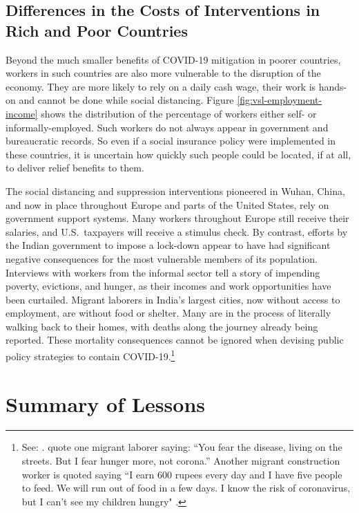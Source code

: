 \documentclass[11pt]{article}
\begin{document}
\begin{mdframed}
\subsection{Differences in the Costs of Interventions in Rich and Poor Countries}

Beyond the much smaller benefits of COVID-19 mitigation in poorer countries, workers in such countries are also more vulnerable to the disruption of the economy. They are more likely to rely on a daily cash wage, their work is hands-on and cannot be done while social distancing. Figure \ref{fig:vsl-employment-income} shows the distribution of the percentage of workers either self- or informally-employed. Such workers do not always appear in government and bureaucratic records. So even if a social insurance policy were implemented in these countries, it is uncertain how quickly such people could be located, if at all, to deliver relief benefits to them.

The social distancing and suppression interventions pioneered in Wuhan, China, and now in place throughout Europe and parts of the United States, rely on government support systems. Many workers throughout Europe still receive their salaries, and U.S.\ taxpayers will receive a stimulus check. By contrast, efforts by the Indian government to impose a lock-down appear to have had significant negative consequences for the most vulnerable members of its population. Interviews with workers from the informal sector tell a story of impending poverty, evictions, and hunger, as their incomes and work opportunities have been curtailed. Migrant laborers in India's largest cities, now without access to employment, are without food or shelter. Many are in the process of literally walking back to their homes, with deaths along the journey already being reported. These mortality consequences cannot be ignored when devising public policy strategies to contain COVID-19.\footnote{
  See: \textcite{abihabib2020b,abihabib2020a,bbc2020,tewari2020}. \textcite{abihabib2020a} quote one migrant laborer saying: ``You fear the disease, living on the streets. But I fear hunger more, not corona.'' Another migrant construction worker is quoted saying ``I earn 600 rupees every day and I have five people to feed. We will run out of food in a few days. I know the risk of coronavirus, but I can't see my children hungry" \parencite{bbc2020}.}

\section{Summary of Lessons}


\end{mdframed}
\end{document}
